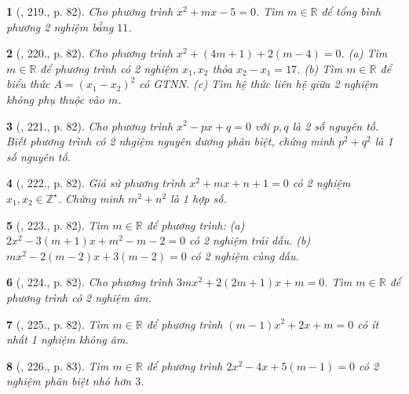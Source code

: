 \documentclass{article}
\newtheorem{baitoan}{}
\begin{document}
\begin{baitoan}[\cite{Tuyen_Toan_9_old}, 219., p. 82]
	Cho phương trình $x^2 + mx - 5 = 0$. Tìm $m\in\mathbb{R}$ để tổng bình phương 2 nghiệm bằng $11$.
\end{baitoan}

\begin{baitoan}[\cite{Tuyen_Toan_9_old}, 220., p. 82]
	Cho phương trình $x^2 + (4m + 1) + 2(m - 4) = 0$. (a) Tìm $m\in\mathbb{R}$ để phương trình có 2 nghiệm $x_1,x_2$ thỏa $x_2 - x_1 = 17$. (b) Tìm $m\in\mathbb{R}$ để biểu thức $A = (x_1 - x_2)^2$ có {\rm GTNN}. (c) Tìm hệ thức liên hệ giữa 2 nghiệm không phụ thuộc vào $m$.
\end{baitoan}

\begin{baitoan}[\cite{Tuyen_Toan_9_old}, 221., p. 82]
	Cho phương trình $x^2 - px + q = 0$ với $p,q$ là 2 số nguyên tố. Biết phương trình có 2 nhgiệm nguyên dương phân biệt, chứng minh $p^2 + q^2$ là 1 số nguyên tố.
\end{baitoan}

\begin{baitoan}[\cite{Tuyen_Toan_9_old}, 222., p. 82]
	Giả sử phương trình $x^2 + mx + n + 1 = 0$ có 2 nghiệm $x_1,x_2\in\mathbb{Z}^\star$. Chứng minh $m^2 + n^2$ là 1 hợp số.
\end{baitoan}

\begin{baitoan}[\cite{Tuyen_Toan_9_old}, 223., p. 82]
	Tìm $m\in\mathbb{R}$ để phương trình: (a) $2x^2 - 3(m + 1)x + m^2 - m - 2 = 0$ có 2 nghiệm trái dấu. (b) $mx^2 - 2(m - 2)x + 3(m - 2) = 0$ có 2 nghiệm cùng dấu.
\end{baitoan}

\begin{baitoan}[\cite{Tuyen_Toan_9_old}, 224., p. 82]
	Cho phương trình $3mx^2 + 2(2m + 1)x + m = 0$. Tìm $m\in\mathbb{R}$ để phương trình có 2 nghiệm âm.
\end{baitoan}

\begin{baitoan}[\cite{Tuyen_Toan_9_old}, 225., p. 82]
	Tìm $m\in\mathbb{R}$ để phương trình $(m - 1)x^2 + 2x + m = 0$ có ít nhất 1 nghiệm không âm.
\end{baitoan}

\begin{baitoan}[\cite{Tuyen_Toan_9_old}, 226., p. 83]
	Tìm $m\in\mathbb{R}$ để phương trình $2x^2 - 4x + 5(m - 1) = 0$ có 2 nghiệm phân biệt nhỏ hơn $3$.
\end{baitoan}
\end{document}
